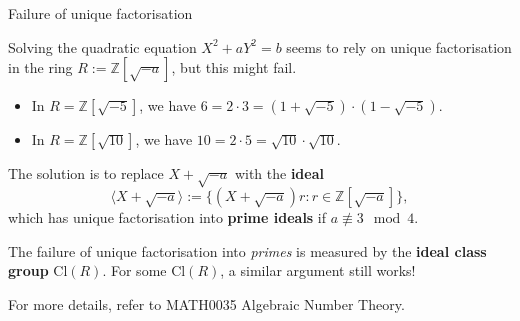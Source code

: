 \documentclass[10pt]{beamer}
\theoremstyle{definition}
\begin{document}
\begin{frame}[t]{Failure of unique factorisation}

Solving the quadratic equation $ X^2 + aY^2 = b $ seems to rely on unique factorisation in the ring $ R := \mathbb{Z}[\sqrt{-a}] $, but this might fail.

\begin{examples}
\begin{itemize}
\item In $ R = \mathbb{Z}[\sqrt{-5}] $, we have $ 6 = 2 \cdot 3 = (1 + \sqrt{-5}) \cdot (1 - \sqrt{-5}) $.
\item In $ R = \mathbb{Z}[\sqrt{10}] $, we have $ 10 = 2 \cdot 5 = \sqrt{10} \cdot \sqrt{10} $.
\end{itemize}
\end{examples}

The solution is to replace $ X + \sqrt{-a} $ with the \textbf{ideal}
$$ \langle X + \sqrt{-a}\rangle := \{(X + \sqrt{-a})r : r \in \mathbb{Z}[\sqrt{-a}]\}, $$
which has unique factorisation into \textbf{prime ideals} if $ a \not\equiv 3 \mod 4 $.

\vspace{0.5cm} The failure of unique factorisation into \emph{primes} is measured by the \textbf{ideal class group} $ \mathrm{Cl}(R) $. For some $ \mathrm{Cl}(R) $, a similar argument still works!

\vspace{0.5cm} For more details, refer to MATH0035 Algebraic Number Theory.

\end{frame}
\end{document}
